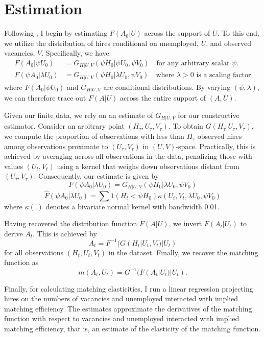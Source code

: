 \documentclass[12pt]{article}
\begin{document}
\section{Estimation}
Following \cite{lange2020beyond}, I begin by estimating $F(A_0|U)$ across the support of $U$. To this end, we utilize the distribution of hires conditional on unemployed, $U$, and observed vacancies, $V$. 
Specifically, we have
\begin{align*}
    F(A_0|\psi U_0) &= G_{H|U,V}(\psi H_0|\psi U_0, \psi V_0) \quad \text{for any arbitrary scalar } \psi.\\
    F(\psi A_0|\lambda U_0) &= G_{H|U,V}(\psi H_0|\lambda U_0, \psi V_0) \quad \text{where } \lambda > 0 \text{ is a scaling factor}
\end{align*}
where $F(A_0|\psi U_0)$ and $ G_{H|U,V}$ are conditional distributions.
By varying $(\psi, \lambda)$, we can therefore trace out $F(A|U)$ across the entire support of $(A, U)$.

Given our finite data, we rely on an estimate of $G_{H|U,V}$ for our constructive estimator. Consider an arbitrary point $(H_\tau, U_\tau, V_\tau)$. To obtain $G(H_\tau|U_\tau, V_\tau)$, we compute the proportion of observations with less than $H_\tau$ observed hires among observations proximate to $(U_\tau, V_\tau)$ in $(U, V)$-space. Practically, this is achieved by averaging across all observations in the data, penalizing those with values $(U_t, V_t)$ using a kernel that weighs down observations distant from $(U_\tau, V_\tau)$. Consequently, our estimate is given by
\[
F(\psi A_0|\lambda U_0) = G_{H|U,V}(\psi H_0|\lambda U_0, \psi V_0)
\]
\[
\hat{F}(\psi A_0|\lambda U_0) = \sum 1(H_t < \psi H_0) \kappa(U_t, V_t, \lambda U_0, \psi V_0)
\]
where $\kappa(.)$ denotes a bivariate normal kernel with bandwidth 0.01.

Having recovered the distribution function $F(A|U)$, we invert $F(A_t|U_t)$ to derive $A_t$. This is achieved by
\[
A_t = F^{-1}(G(H_t|U_t, V_t)|U_t)
\]
for all observations $(H_t, U_t, V_t)$ in the dataset. Finally, we recover the matching function as
\[
m(A_t, U_t) = G^{-1}(F(A_t|U_t)|U_t).
\]


Finally, for calculating matching elasticities, I run a linear regression projecting hires on the numbers of vacancies and unemployed interacted with implied matching efficiency.
The estimates approximate the derivatives of the matching function with respect to vacancies and unemployed interacted with implied matching efficiency, that is, an estimate of
the elasticity of the matching function.
\end{document}
